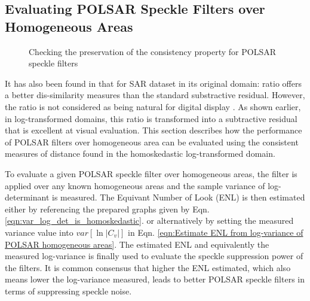 \subsection{Evaluating POLSAR Speckle Filters over Homogeneous Areas}

\begin{figure}[h!]
	\hfill	
  \caption{Checking the preservation of the consistency property for POLSAR speckle filters}  
\end{figure}

It has also been found in \cite{Rignot_1993_TGRS_896} that for SAR dataset in its original domain: 
   ratio offers a better dis-similarity measures than the standard substractive residual. 
However, the ratio is not considered as being natural for digital display \cite{Medeiros_2003_IJRS}.
As shown earlier, %
  in log-transformed domains, this ratio is transformed into a subtractive residual that is excellent at visual evaluation.
This section describes how the performance of POLSAR filters over homogeneous area can be evaluated
  using the consistent measures of distance found in the homoskedastic log-transformed domain.

To evaluate a given POLSAR speckle filter over homogeneous areas,
  the filter is applied over any known homogeneous areas and the sample variance of log-determinant is measured.
The Equivant Number of Look (ENL) is then estimated
  either by referencing the prepared graphs given by Eqn. \ref{eqn:var_log_det_is_homoskedastic}. %
  or alternatively by setting the measured variance value into $var[\ln{|C_v|}]$ in Eqn. \ref{eqn:Estimate ENL from log-variance of POLSAR homogeneous areas}.
The estimated ENL and equivalently the measured log-variance is finally used to evaluate the speckle suppression power of the filters.
It is common consensus that higher the ENL estimated,
  which also means lower the log-variance measured,
  leads to better POLSAR speckle filters in terms of suppressing speckle noise.
  
